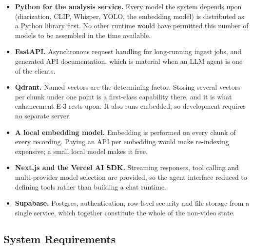 \begin{itemize}
  \item \textbf{Python for the analysis service.} Every model the system depends upon
        (diarization, CLIP, Whisper, YOLO, the embedding model) is distributed
        as a Python library first. No other runtime would have permitted this number
        of models to be assembled in the time available.
  \item \textbf{FastAPI.} Asynchronous request handling for long-running ingest jobs,
        and generated API documentation, which is material when an LLM agent is one of
        the clients.
  \item \textbf{Qdrant.} Named vectors are the determining factor. Storing several
        vectors per chunk under one point is a first-class capability there, and it is
        what enhancement E-3 rests upon. It also runs embedded, so development
        requires no separate server.
  \item \textbf{A local embedding model.} Embedding is performed on every chunk of
        every recording. Paying an API per embedding would make re-indexing expensive;
        a small local model makes it free.
  \item \textbf{Next.js and the Vercel AI SDK.} Streaming responses, tool calling and
        multi-provider model selection are provided, so the agent interface reduced to
        defining tools rather than building a chat runtime.
  \item \textbf{Supabase.} Postgres, authentication, row-level security and file
        storage from a single service, which together constitute the whole of the
        non-video state.
\end{itemize}

\subsection{System Requirements}

